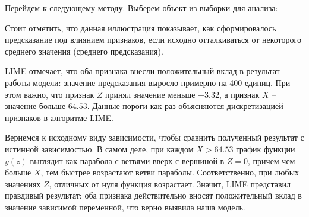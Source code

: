 Перейдем к следующему методу. Выберем объект из выборки для анализа:

\begin{figure}[h]
\end{figure}

Стоит отметить, что данная иллюстрация показывает, как сформировалось предсказание под влиянием признаков, если исходно отталкиваться от некоторого среднего значения (среднего предсказания).

LIME отмечает, что оба признака внесли положительный вклад в результат работы модели: значение предсказания выросло примерно на 400 единиц. При этом важно, что признак $Z$ принял значение меньше $-3.32$, а признак $X$ -- значение больше $64.53$. Данные пороги как раз объясняются дискретизацией признаков в алгоритме LIME.

Вернемся к исходному виду зависимости, чтобы сравнить полученный результат с истинной зависимостью. В самом деле, при каждом $X > 64.53$ график функции $y(z)$ выглядит как парабола с ветвями вверх с вершиной в $Z=0$, причем чем больше $X$, тем быстрее возрастают ветви параболы. Соответственно, при любых значениях $Z$, отличных от нуля функция возрастает. Значит, LIME представил правдивый результат: оба признака действительно вносят положительный вклад в значение зависимой переменной, что верно выявила наша модель.
